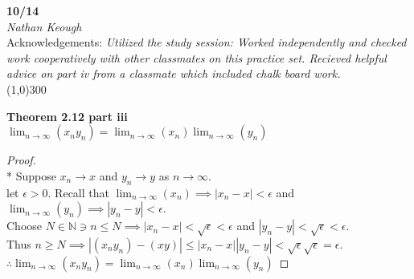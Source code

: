 \documentclass[a4paper]{article}
\newcommand{\nat}{\mathbb{N}}
\begin{document}
    \begin{center}
        \Large \textbf{10/14} \\
        \large \textit{Nathan Keough} \\
        Acknowledgements: \emph{Utilized the study session: Worked independently and checked work cooperatively with other classmates on this practice set. Recieved helpful advice on part iv from a classmate which included chalk board work.} \vspace{.5pc} \\ \line(1,0){300} 
        \vspace{1pc}
    \end{center} 
    
    \begin{flushleft}


        \textbf{Theorem 2.12 part iii} \\
        $\lim_{n \to \infty} \left( x_n y_n \right) = \lim_{n \to \infty}\left( x_n\right) \lim_{n \to \infty} \left( y_n\right)$ \\

        \begin{proof}\mbox{}\\*
            Suppose $x_n \to x$ and $y_n \to y$ as $n \to \infty$. \\
            let $\epsilon > 0$. Recall that $\lim_{n \to \infty}\left( x_n\right) \implies |x_n -x|<\epsilon$ and \\
            $\lim_{n \to \infty} \left( y_n\right) \implies |y_n -y| < \epsilon$. \\
            Choose $N \in \nat \ni n \leq N \implies |x_n -x| < \sqrt{\epsilon} < \epsilon$ and  $|y_n -y| < \sqrt{\epsilon} < \epsilon$. \\
            Thus $n \geq N \implies |(x_n y_n)-(x y)| \leq |x_n -x| |y_n -y| < \sqrt{\epsilon} \sqrt{\epsilon}  = \epsilon$. 
            $\therefore \lim_{n \to \infty} \left( x_n y_n \right) = \lim_{n \to \infty}\left( x_n\right) \lim_{n \to \infty} \left( y_n\right)$

        \end{proof}



\end{flushleft}
\end{document}
